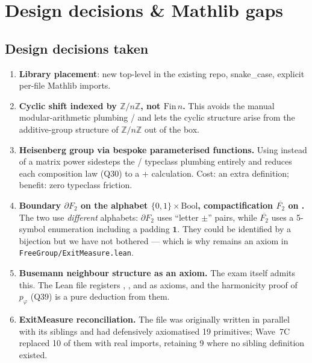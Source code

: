 \documentclass[11pt,a4paper]{article}
\newcommand{\lmod}[1]{\texttt{\small #1}}
\newcommand{\Z}{\mathbb{Z}}
\newcommand{\BFG}{\partial F_2}
\newcommand{\cpt}{\overline{F_2}}
\newcommand{\poiss}{p}
\theoremstyle{plain}
\theoremstyle{definition}
\begin{document}
\section{Design decisions \& Mathlib gaps}\label{sec:decisions}

\subsection{Design decisions taken}
\begin{enumerate}[leftmargin=1.3em]
\item \textbf{Library placement}: new top-level  in the
      existing repo, snake\_case, explicit per-file Mathlib imports.
\item \textbf{Cyclic shift indexed by $\Z/n\Z$, not $\text{Fin}\,n$.} This
      avoids the manual modular-arithmetic plumbing
      / and lets the cyclic structure arise
      from the additive-group structure of $\Z/n\Z$ out of the box.
\item \textbf{Heisenberg group via bespoke parameterised functions.}
      Using  instead of
      a matrix power  sidesteps the
      / typeclass plumbing entirely and
      reduces each composition law (Q30) to a  + 
      calculation. Cost: an extra definition; benefit: zero typeclass
      friction.
\item \textbf{Boundary $\BFG$ on the alphabet $\{0,1\}\times\text{Bool}$,
      compactification $\cpt$ on .} The two use
      \emph{different} alphabets: $\BFG$ uses ``letter $\pm$'' pairs,
      while $\cpt$ uses a 5-symbol enumeration including a padding
      $\mathbf 1$. They could be identified by a bijection but we
      have not bothered --- which is why  remains
      an axiom in \lmod{FreeGroup/ExitMeasure.lean}.
\item \textbf{Busemann neighbour structure as an axiom.} The exam
      itself admits this. The Lean file registers
      ,
      , and
       as axioms, and the
      harmonicity proof of $\poiss_\varphi$ (Q39) is a pure deduction
      from them.
\item \textbf{ExitMeasure reconciliation.} The file was originally
      written in parallel with its siblings and had defensively
      axiomatised 19 primitives; Wave~7C replaced 10 of them with real
      imports, retaining 9 where no sibling definition existed.
\end{enumerate}
\end{document}
